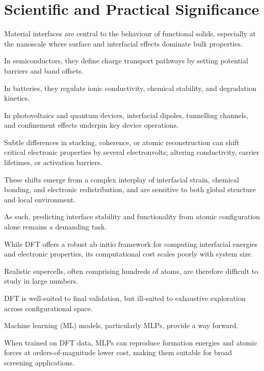 \section{Scientific and Practical Significance} \label{section:scientific_and_practical_significance}

\label{para:interfaces_nanoscale_behaviour} %

Material interfaces are central to the behaviour of functional solids, especially at the nanoscale where surface and
interfacial effects dominate bulk properties.

In semiconductors, they define charge transport pathways by setting potential barriers and band offsets.

In batteries, they regulate ionic conductivity, chemical stability, and degradation kinetics.

In photovoltaics and quantum devices, interfacial dipoles, tunnelling channels, and confinement effects underpin key
device operations.

\label{para:interfacial_electronic_shifts} %

Subtle differences in stacking, coherence, or atomic reconstruction can shift critical electronic properties by several
electronvolts; altering conductivity, carrier lifetimes, or activation barriers.

These shifts emerge from a complex interplay of interfacial strain, chemical bonding, and electronic redistribution, and
are sensitive to both global structure and local environment.

As such, predicting interface stability and functionality from atomic configuration alone remains a demanding task.

\label{para:dft_scaling_cost} %

While DFT offers a robust ab initio framework for computing interfacial energies and
electronic properties, its computational cost scales poorly with system size.

Realistic supercells, often comprising hundreds of atoms, are therefore difficult to study in large numbers.

DFT is well-suited to final validation, but ill-suited to exhaustive exploration across configurational space.

\label{para:mlp_workflow_integration} %

Machine learning (ML) models, particularly MLPs, provide a way forward.

When trained on DFT data, MLPs can reproduce formation energies and atomic forces at orders-of-magnitude lower cost,
making them suitable for broad screening applications.

